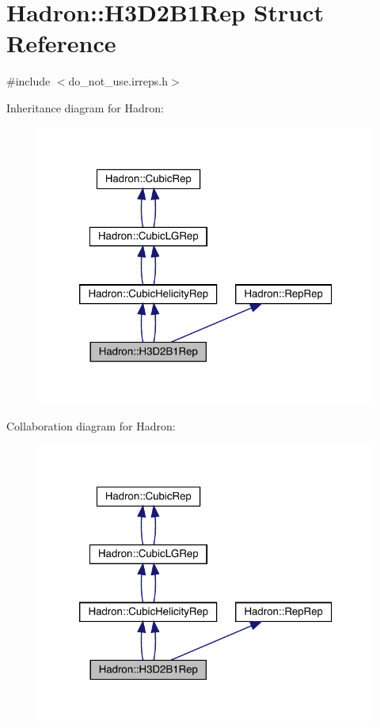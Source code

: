 \hypertarget{structHadron_1_1H3D2B1Rep}{}\section{Hadron\+:\+:H3\+D2\+B1\+Rep Struct Reference}
\label{structHadron_1_1H3D2B1Rep}


{\ttfamily \#include $<$do\+\_\+not\+\_\+use.\+irreps.\+h$>$}



Inheritance diagram for Hadron\+:\nopagebreak
\begin{figure}[H]
\begin{center}
\leavevmode
\includegraphics[width=320pt]{de/d85/structHadron_1_1H3D2B1Rep__inherit__graph}
\end{center}
\end{figure}


Collaboration diagram for Hadron\+:\nopagebreak
\begin{figure}[H]
\begin{center}
\leavevmode
\includegraphics[width=320pt]{de/d2b/structHadron_1_1H3D2B1Rep__coll__graph}
\end{center}
\end{figure}
